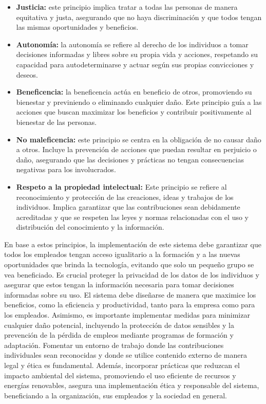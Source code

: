 \begin{itemize}
    \item \textbf{Justicia:} este principio implica tratar a todas las personas 
    de manera equitativa y justa, asegurando que no haya discriminación 
    y que todos tengan las mismas oportunidades y beneficios.
    \item \textbf{Autonomía:} la autonomía se refiere al derecho de los individuos 
    a tomar decisiones informadas y libres sobre su propia vida y acciones, 
    respetando su capacidad para autodeterminarse y actuar según sus propias 
    convicciones y deseos.
    \item \textbf{Beneficencia:} la beneficencia actúa en beneficio de otros, 
    promoviendo su bienestar y previniendo o eliminando cualquier daño. Este 
    principio guía a las acciones que buscan maximizar los beneficios y contribuir 
    positivamente al bienestar de las personas.
    \item \textbf{No maleficencia:} este principio se centra en la obligación de 
    no causar daño a otros. Incluye la prevención de acciones que puedan resultar 
    en perjuicio o daño, asegurando que las decisiones y prácticas no tengan 
    consecuencias negativas para los involucrados.
    \item \textbf{Respeto a la propiedad intelectual:} Este principio se refiere al 
    reconocimiento y protección de las creaciones, ideas y trabajos de los 
    individuos. Implica garantizar que las contribuciones sean debidamente 
    acreditadas y que se respeten las leyes y normas relacionadas con el uso 
    y distribución del conocimiento y la información.
\end{itemize}

En base a estos principios, la implementación de este sistema debe garantizar 
que todos los empleados tengan acceso igualitario a la formación y a las nuevas 
oportunidades que brinda la tecnología, evitando que solo un pequeño grupo se vea 
beneficiado. Es crucial proteger la privacidad de los datos de los individuos y 
asegurar que estos tengan la información necesaria para tomar decisiones informadas 
sobre su uso. El sistema debe diseñarse de manera que maximice los beneficios, como 
la eficiencia y productividad, tanto para la empresa como para los empleados. 
Asimismo, es importante implementar medidas para minimizar cualquier daño potencial, 
incluyendo la protección de datos sensibles y la prevención de la pérdida de empleos 
mediante programas de formación y adaptación. Fomentar un entorno de trabajo donde 
las contribuciones individuales sean reconocidas y donde se utilice contenido externo 
de manera legal y ética es fundamental. Además, incorporar prácticas que reduzcan el 
impacto ambiental del sistema, promoviendo el uso eficiente de recursos y energías 
renovables, asegura una implementación ética y responsable del sistema, beneficiando 
a la organización, sus empleados y la sociedad en general.

\pagebreak